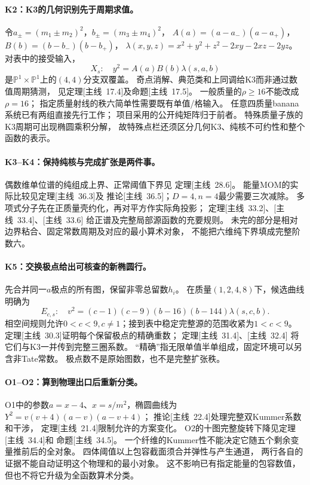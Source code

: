 \documentclass[11pt,a4paper]{ctexart}
\theoremstyle{cnplain}\newtheorem{theorem}{定理}[section]
\theoremstyle{definition}\newtheorem{definition}[theorem]{定义}
\theoremstyle{remark}\newtheorem{remark}[theorem]{注}
\begin{document}
\paragraph{K2：K3的几何识别先于周期求值。}
令$a_\pm=(m_1\pm m_2)^2$，$b_\pm=(m_3\pm m_4)^2$，
$A(a)=(a-a_-)(a-a_+)$，$B(b)=(b-b_-)(b-b_+)$，
$\lambda(x,y,z)=x^2+y^2+z^2-2xy-2xz-2yz$。
对表中的接受输入，
\[
 X_s:\quad y^2=A(a)B(b)\lambda(s,a,b)
\]
是$\mathbb P^1\times\mathbb P^1$上的$(4,4)$分支双覆盖。
奇点消解、典范类和上同调给K3而非通过数值周期猜测，
见定理\textup{[主线~17.4]}及命题\textup{[主线~17.5]}。
一般质量的$\rho\ge16$不能改成$\rho=16$；
指定质量射线的秩六简单性需要既有单值/格输入。
任意四质量banana系统已有两组直接先行工作\cite{LitDMPS,LitPTWW}；
项目采用的公开纯矩阵归于前者。
特殊质量子族的K3周期可出现椭圆乘积分解\cite{LitDM,LitDMfull}，
故特殊点栏还须区分几何K3、纯核不可约性和整个函数的表示。

\paragraph{K3--K4：保持纯核与完成扩张是两件事。}
偶数维单位谱的纯组成上界、正常阈值下界见
定理\textup{[主线~28.6]}。
能量MOM的实际比较见定理\textup{[主线~36.3]}及
推论\textup{[主线~36.5]}；$D=4,n=4$最少需要三次减除。
多项式分子先在正质量壳约化，再对平方作实际角投影；
定理\textup{[主线~33.2]}、\textup{[主线~33.4]}、\textup{[主线~33.6]}
给正谱及完整局部源函数的充要规则。
未完的部分是相对边界粘合、固定常数周期及对应的最小算术对象，
不能把六维纯下界填成完整阶数六。

\paragraph{K5：交换极点给出可核查的新椭圆行。}
先合并同一$a$极点的所有图，保留非零总留数$h_i$。
在质量$(1,2,4,8)$下，候选曲线明确为
\[
 E_{c,s}:\quad v^2=(c-1)(c-9)(b-16)(b-144)\lambda(s,c,b).
\]
相空间规则允许$0<c<9,c\ne1$；接到表中稳定完整源的范围收紧为$1<c<9$。
定理\textup{[主线~30.3]}证明每个保留极点的精确重数；
定理\textup{[主线~31.4]}、\textup{[主线~32.4]}
将它们与K3一并传到完整三圈系数。
“精确”指无限单值半单组成，固定环境可以另含非Tate常数。
极点数不是原始图数，也不是完整扩张秩。

\paragraph{O1--O2：算到物理出口后重新分类。}
O1中的参数$a=x-4$、$x=s/m^2$，椭圆曲线为
$Y^2=v(v+4)(a-v)(a-v+4)$；
推论\textup{[主线~22.4]}处理完整双Kummer系数和干涉，
定理\textup{[主线~21.4]}限制允许的方案变化。
O2的十图完整旋转下降见定理\textup{[主线~34.4]}和
命题\textup{[主线~34.5]}。
一个纤维的Kummer性不能决定它随五个剩余变量推前后的全对象。
四体阈值以上包容截面须合并弹性与产生通道，
两行各自的证据不能自动证明这个物理和的最小对象。
这不影响已有指定能量的包容数值，但也不将它升级为全函数算术分类。
\end{document}
